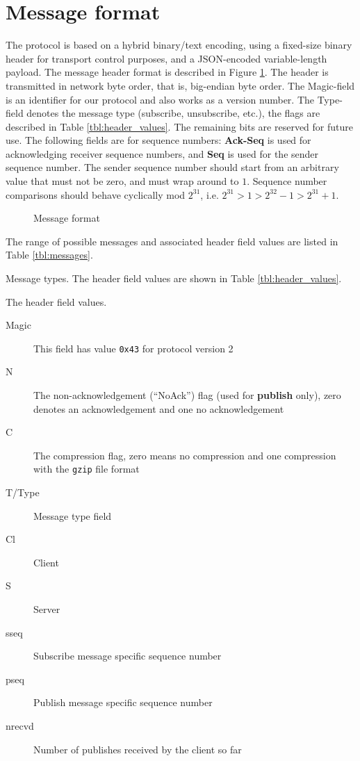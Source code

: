 \documentclass[a4paper]{article}
\begin{document}
\section{Message format}
The protocol is based on a hybrid binary/text encoding, using a fixed-size binary header for transport control purposes, and a JSON-encoded variable-length payload.
The message header format is described in Figure \ref{fig:header}. The header
is transmitted in network byte order, that is, big-endian byte order. The 
Magic-field is an identifier for our protocol and also works as a version
number. The Type-field denotes the message type (subscribe, unsubscribe, etc.),
the flags are described in Table \ref{tbl:header_values}. The remaining bits are 
reserved for future use. The following fields are for sequence numbers: 
\textbf{Ack-Seq} is used for acknowledging receiver sequence numbers, and 
\textbf{Seq} is used for the sender sequence number. The sender sequence number
should start from an arbitrary value that must not be zero, and must wrap around to $1$. Sequence number comparisons should behave cyclically mod $2^{31}$, i.e. $2^{31} > 1 > 2^{32} - 1 > 2^{31} + 1$.

\begin{figure}
	\begin{center}
		
		\caption{Message format}
		\label{fig:header}
	\end{center}
\end{figure}

The range of possible messages and associated header field values are listed in Table 
\ref{tbl:messages}.

\begin{table}
\begin{center}
\caption{Message types. The header field values are shown in Table \ref{tbl:header_values}.}

\label{tbl:messages}
\end{center}
\end{table}

\begin{table}
\caption{The header field values.}
\begin{description}
  \item[Magic] This field has value \texttt{0x43} for protocol version 2
  \item[N] The non-acknowledgement (``NoAck'') flag (used for \textbf{publish} only), zero
  denotes an acknowledgement and one no acknowledgement
  \item[C] The compression flag, zero means no compression and one compression
  with the \texttt{gzip} file format
  \item[T/Type] Message type field
  \item[Cl] Client
  \item[S] Server
  \item[sseq] Subscribe message specific sequence number
  \item[pseq] Publish message specific sequence number
  \item[nrecvd] Number of publishes received by the client so far
\end{description}
\label{tbl:header_values}
\end{table}
\end{document}
